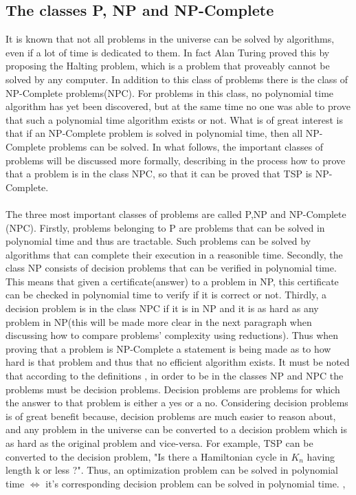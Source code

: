 \documentclass{article}
\begin{document}
\subsection{The classes P, NP and NP-Complete}
It is known that not all problems in the universe can be solved by algorithms, even if a lot of time is dedicated to them. In fact Alan Turing proved this by proposing the Halting problem, which is a problem that proveably cannot be solved by any computer. In addition to this class of problems there is the class of NP-Complete problems(NPC). For problems in this class, no polynomial time algorithm has yet been discovered, but at the same time no one was able to prove that such a polynomial time algorithm exists or not. What is of great interest is that if an NP-Complete problem is solved in polynomial time, then all NP-Complete problems can be solved.  In what follows, the important classes of problems will be discussed more formally, describing in the process how to prove that a problem is in the class NPC, so that it can be proved that TSP is NP-Complete.  \cite{geeksforgeeks_2018_2}\\
\\
The three most important classes of problems are called P,NP and NP-Complete (NPC). Firstly, problems belonging to P are problems that can be solved in polynomial time and thus are tractable. Such problems can be solved by algorithms that can complete their execution in a reasonible time. Secondly, the class NP consists of decision problems that can be verified in polynomial time. This means that given a certificate(answer) to a problem in NP, this certificate can be checked in polynomial time to verify if it is correct or not. Thirdly, a decision problem is in the class NPC if it is in NP and it is as hard as any problem in NP(this will be made more clear in the next paragraph when discussing how to compare problems' complexity using reductions). Thus when proving that a problem is NP-Complete a statement is being made as to how hard is that problem and thus that no efficient algorithm exists. It must be noted that according to the definitions , in order to be in the classes NP and NPC the problems must be decision problems. Decision problems are problems for which the answer to that problem is either a yes or a no. Considering decision problems is of great benefit because, decision problems are much easier to reason about, and any problem in the universe can be converted to a decision problem which is as hard as the original problem and vice-versa. For example, TSP can be converted to the decision problem, "Is there a Hamiltonian cycle in $K_n$ having length k or less ?". Thus, an optimization problem can be solved in polynomial time $\iff$ it's corresponding decision problem can be solved in polynomial time.  \cite{cormen_leiserson_rivest_stein}, \cite{problems_in_computer_science} \\
\end{document}
